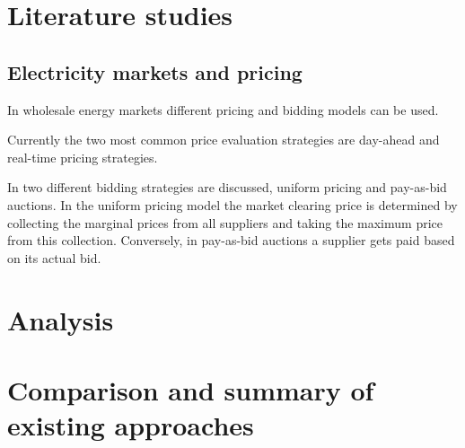 

\section{Literature studies}

\subsection{Electricity markets and pricing}

In wholesale energy markets different pricing and bidding models can be used. 

Currently the two most common price evaluation strategies are day-ahead and real-time pricing strategies. 

In \cite{uniform2008tierney} two different bidding strategies are discussed, uniform pricing and pay-as-bid auctions. In the uniform pricing model the market clearing price is determined by collecting the marginal prices from all suppliers and taking the maximum price from this collection. Conversely, in pay-as-bid auctions a supplier gets paid based on its actual bid. 


\section{Analysis}


\section{Comparison and summary of existing approaches}

